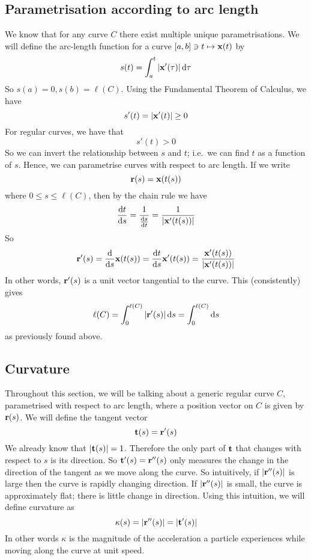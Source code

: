 \subsection{Parametrisation according to arc length}
We know that for any curve \(C\) there exist multiple unique parametrisations.
We will define the arc-length function for a curve \([a, b] \ni t \mapsto \vb x(t)\) by
\[
	s(t) = \int_a^t \abs{\vb x'(\tau)} \,\dd \tau
\]
So \(s(a) = 0, s(b) = \ell(C)\).
Using the Fundamental Theorem of Calculus, we have
\[
	s'(t) = \abs{\vb x'(t)} \geq 0
\]
For regular curves, we have that
\[
	s'(t) > 0
\]
So we can invert the relationship between \(s\) and \(t\); i.e.\ we can find \(t\) as a function of \(s\).
Hence, we can parametrise curves with respect to arc length.
If we write
\[
	\vb r(s) = \vb x(t(s))
\]
where \(0 \leq s \leq \ell(C)\), then by the chain rule we have
\[
	\frac{\dd{t}}{\dd{s}} = \frac{1}{\frac{\dd{s}}{\dd{t}}} = \frac{1}{\abs{\vb x'(t(s))}}
\]
So
\[
	\vb r'(s) = \frac{\dd}{\dd{s}} \vb x(t(s)) = \frac{\dd{t}}{\dd{s}} \vb x'(t(s)) = \frac{\vb x'(t(s))}{\abs{\vb x'(t(s))}}
\]
In other words, \(\vb r'(s)\) is a unit vector tangential to the curve.
This (consistently) gives
\[
	\ell(C) = \int_0^{\ell(C)} \abs{\vb r'(s)} \dd{s} = \int_0^{\ell(C)} \dd{s}
\]
as previously found above.

\subsection{Curvature}
Throughout this section, we will be talking about a generic regular curve \(C\), parametrised with respect to arc length, where a position vector on \(C\) is given by \(\vb r(s)\).
We will define the tangent vector
\[
	\vb t(s) = \vb r'(s)
\]
We already know that \(\abs{\vb t(s)} = 1\).
Therefore the only part of \(\vb t\) that changes with respect to \(s\) is its direction.
So \(\vb t'(s) = \vb r''(s)\) only measures the change in the direction of the tangent as we move along the curve.
So intuitively, if \(\abs{\vb r''(s)}\) is large then the curve is rapidly changing direction.
If \(\abs{\vb r''(s)}\) is small, the curve is approximately flat; there is little change in direction.
Using this intuition, we will define curvature as
\[
	\kappa(s) = \abs{\vb r''(s)} = \abs{\vb t'(s)}
\]
In other words \(\kappa\) is the magnitude of the acceleration a particle experiences while moving along the curve at unit speed.


